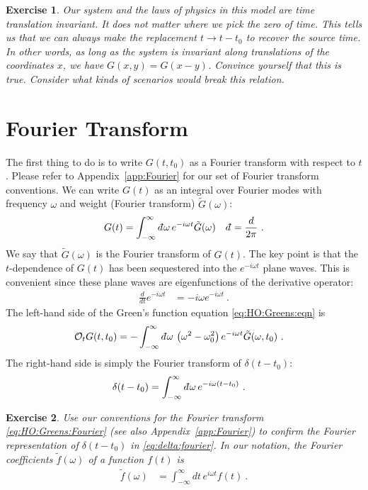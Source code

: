\documentclass[
  11pt,
	colorful,
	raggedright,
]{tufte-style-thesis-flip}
\newtheorem{exercise}{Exercise}[section]
\renewcommand{\dbar}{d\mkern-6mu\mathchar'26\hspace{-.1em}}    %
\begin{document}
\begin{exercise}
Our system and the laws of physics in this model are time translation invariant. It does not matter where we pick the zero of time. This tells us that we can always make the replacement $t\to t-t_0$ to recover the source time. In other words, as long as the system is invariant along translations of the coordinates $x$, we have $G(x,y) = G(x-y)$. Convince yourself that this is true. Consider what kinds of scenarios would break this relation.
\end{exercise}

\section{Fourier Transform}

The first thing to do is to write $G(t,t_0)$ as a Fourier transform with respect to $t$. Please refer to Appendix~\ref{app:Fourier} for our set of Fourier transform conventions. We can write $G(t)$ as an integral over Fourier modes with frequency $\omega$ and weight (Fourier transform) $\tilde G(\omega)$:
\begin{align}
  G(t) &= \int_{-\infty}^\infty\dbar \omega \, e^{-i\omega t} \tilde G(\omega) 
  &
  \dbar = \frac{d}{2\pi}
  \ .
  \label{eq:HO:Greens:Fourier}
\end{align}
We say that $\tilde G(\omega)$ is the Fourier transform of $G(t)$. The key point is that the $t$-dependence of $G(t)$ has been sequestered into the $e^{-i\omega t}$ plane waves. This is convenient since these plane waves are eigenfunctions of the derivative operator:
\begin{align}
  \frac{d}{dt} e^{-i\omega t} &= -i\omega e^{-i\omega t} \ .
\end{align}
The left-hand side of the Green's function equation \eqref{eq:HO:Greens:eqn} is
\begin{align}
  \mathcal O_t G(t,t_0) 
  &= 
  -
  \int_{-\infty}^\infty \dbar \omega \, 
  \left(\omega^2-\omega_0^2\right) e^{-i\omega t} \tilde G(\omega,t_0) \ .
\end{align}
The right-hand side is simply the Fourier transform of $\delta(t-t_0)$:
\begin{align}
  \delta(t-t_0)
  &=
  \int_{-\infty}^\infty \dbar \omega \, e^{-i\omega (t-t_0)} \ .
  \label{eq:delta:fourier}
\end{align}
\begin{exercise}
Use our conventions for the Fourier transform \eqref{eq:HO:Greens:Fourier} (see also Appendix~\ref{app:Fourier}) to confirm the Fourier representation of $\delta(t-t_0)$ in \eqref{eq:delta:fourier}. In our notation, the Fourier coefficients $\tilde f(\omega)$ of a function $f(t)$ is
\begin{align}
  \tilde f(\omega) &= 
  \int_{-\infty}^\infty d t\, e^{i\omega t} f(t) \ .
\end{align}
\end{exercise}
\end{document}
